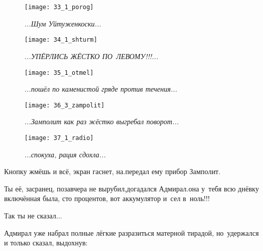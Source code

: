 \begin{figure}[h]
	\centering
	\texttt{[image: 33\_1\_porog]}
	\caption{\small\textit{...Шум Уйтуженкоски...}}
\end{figure}

\newpage

\begin{figure}[h]
	\centering
	\texttt{[image: 34\_1\_shturm]}
	\caption{\small\textit{...УПЁРЛИСЬ ЖЁСТКО ПО~ЛЕВОМУ!!!...}}
\end{figure}

\newpage

\begin{figure}[h]
	\centering	
	\texttt{[image: 35\_1\_otmel]}
	\caption{\small\textit{...пошёл по каменистой гряде против течения...}}
\end{figure}

\newpage

\begin{figure}[h]
	\centering
	\texttt{[image: 36\_3\_zampolit]}
	\caption{\small\textit{...Замполит как раз жёстко выгребал поворот...}}
\end{figure}

\newpage

\begin{wrapfigure}[12]{r}{0.48\textwidth}
	\centering
	\texttt{[image: 37\_1\_radio]}
	\caption{\small\textit{...спокуха, рация сдохла...}}
\end{wrapfigure}

\diagdash Кнопку жмёшь и всё, экран гаснет, на.\mdash передал ему прибор Замполит.

\diagdash Ты её, засранец, позавчера не вырубил,\mdash догадался Адмирал.\mdash она у~тебя всю днёвку включённая была, сто процентов, вот аккумулятор и~сел в~ноль!!!

\diagdash Так ты не сказал$\ldots$

Адмирал уже набрал полные лёгкие разразиться матерной тирадой, но~удержался и только сказал, выдохнув:

\newpage

